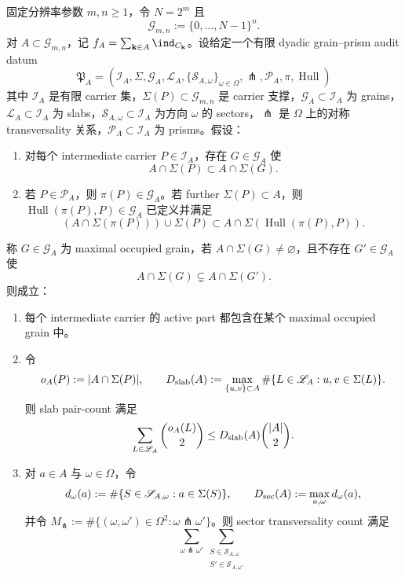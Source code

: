 \begin{proposition}\label{distill:wang_zahl-grain_prism_structure_dichotomy-spg-dyadic-carrier-audit}
固定分辨率参数 \(m,n\ge 1\)，令 \(N=2^m\) 且
\[
\mathcal G_{m,n}:=\{0,\ldots,N-1\}^n .
\]
对 \(A\subset\mathcal G_{m,n}\)，记 \(f_A=\sum_{\mathbf k\in A}\ind_{C_{\mathbf k}}\)。设给定一个有限 dyadic grain--prism audit datum
\[
\mathfrak P_A=(\mathscr I_A,\Sigma,\mathscr G_A,\mathscr L_A,\{\mathscr S_{A,\omega}\}_{\omega\in\Omega},\pitchfork,\mathscr P_A,\pi,\operatorname{Hull})
\]
其中 \(\mathscr I_A\) 是有限 carrier 集，\(\Sigma(P)\subset\mathcal G_{m,n}\) 是 carrier 支撑，\(\mathscr G_A\subset\mathscr I_A\) 为 grains，\(\mathscr L_A\subset\mathscr I_A\) 为 slabs，\(\mathscr S_{A,\omega}\subset\mathscr I_A\) 为方向 \(\omega\) 的 sectors，\(\pitchfork\) 是 \(\Omega\) 上的对称 transversality 关系，\(\mathscr P_A\subset\mathscr I_A\) 为 prisms。假设：
\begin{enumerate}
  \item 对每个 intermediate carrier \(P\in\mathscr I_A\)，存在 \(G\in\mathscr G_A\) 使
  \[
  A\cap\Sigma(P)\subset A\cap\Sigma(G).
  \]
  \item 若 \(P\in\mathscr P_A\)，则 \(\pi(P)\in\mathscr G_A\)。若 further \(\Sigma(P)\subset A\)，则 \(\operatorname{Hull}(\pi(P),P)\in\mathscr G_A\) 已定义并满足
  \[
  (A\cap\Sigma(\pi(P)))\cup \Sigma(P)
  \subset
  A\cap\Sigma(\operatorname{Hull}(\pi(P),P)).
  \]
\end{enumerate}
称 \(G\in\mathscr G_A\) 为 maximal occupied grain，若 \(A\cap\Sigma(G)\ne\varnothing\)，且不存在 \(G'\in\mathscr G_A\) 使
\[
A\cap\Sigma(G)\subsetneq A\cap\Sigma(G').
\]
则成立：
\begin{enumerate}
  \item 每个 intermediate carrier 的 active part 都包含在某个 maximal occupied grain 中。
  \item 令
  \[
  o_A(P):=|A\cap\Sigma(P)|,
  \qquad
  D_{\rm slab}(A):=\max_{\{u,v\}\subset A}\#\{L\in\mathscr L_A:u,v\in\Sigma(L)\}.
  \]
  则 slab pair-count 满足
  \[
  \sum_{L\in\mathscr L_A}\binom{o_A(L)}2
  \le
  D_{\rm slab}(A)\binom{|A|}{2}.
  \]
  \item 对 \(a\in A\) 与 \(\omega\in\Omega\)，令
  \[
  d_\omega(a):=\#\{S\in\mathscr S_{A,\omega}:a\in\Sigma(S)\},
  \qquad
  D_{\rm sec}(A):=\max_{a,\omega}d_\omega(a),
  \]
  并令 \(M_{\pitchfork}:=\#\{(\omega,\omega')\in\Omega^2:\omega\pitchfork\omega'\}\)。则 sector transversality count 满足
  \[
  \sum_{\omega\pitchfork\omega'}\sum_{\substack{S\in\mathscr S_{A,\omega}\\ S'\in\mathscr S_{A,\omega'}}}
\]
\end{enumerate}
\end{proposition}
